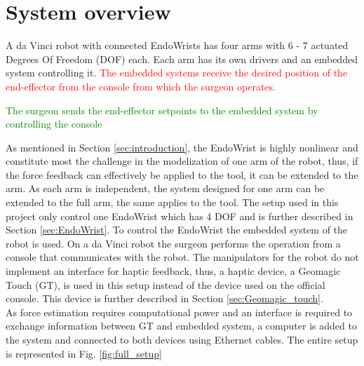 \section{System overview}\label{sec:system_overview}
A da Vinci robot with connected EndoWrists has four arms with 6 - 7 actuated Degrees Of Freedom (DOF) each. Each arm has its own drivers and an embedded system controlling it. \textcolor{red}{The embedded systems receive the desired position of the end-effector from the console from which the surgeon operates.}

 \textcolor{green}{The surgeon sends the end-effector setpoints to the embedded system by controlling the console}

As mentioned in Section \ref{sec:introduction}, the EndoWrist is highly nonlinear and constitute most the challenge in the modelization of one arm of the robot, thus, if the force feedback can effectively be applied to the tool, it can be extended to the arm. As each arm is independent, the system designed for one arm can be extended to the full arm, the same applies to the tool. The setup used in this project only control one EndoWrist which has 4 DOF and is further described in Section \ref{sec:EndoWrist}.%
To control the EndoWrist the embedded system of the robot is used. On a da Vinci robot the surgeon performs the operation from a console that communicates with the robot. The manipulators for the robot do not implement an interface for haptic feedback, thus, a haptic device, a Geomagic Touch (GT), is used in this setup instead of the device used on the official console. This device is further described in Section \ref{sec:Geomagic_touch}.\\
As force estimation requires computational power and an interface is required to exchange information between GT and embedded system, a computer is added to the system and connected to both devices using Ethernet cables. The entire setup is represented in Fig. \ref{fig:full_setup}
